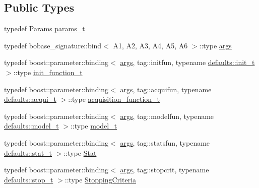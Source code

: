 \subsection*{Public Types}
\begin{DoxyCompactItemize}
\item 
typedef Params \hyperlink{classlimbo_1_1bayes__opt_1_1_bo_base_ae46fa6c574ca2a2c4368c8c9d3ff63e5}{params\+\_\+t}
\item 
typedef bobase\+\_\+signature\+::bind$<$ A1, A2, A3, A4, A5, A6 $>$\+::type \hyperlink{classlimbo_1_1bayes__opt_1_1_bo_base_a3844c259aa1e59d0241f90390aa6f7fa}{args}
\item 
typedef boost\+::parameter\+::binding$<$ \hyperlink{classlimbo_1_1bayes__opt_1_1_bo_base_a3844c259aa1e59d0241f90390aa6f7fa}{args}, tag\+::initfun, typename \hyperlink{structlimbo_1_1bayes__opt_1_1_bo_base_1_1defaults_a675d927a474fc77608cc63c8406448f7}{defaults\+::init\+\_\+t} $>$\+::type \hyperlink{classlimbo_1_1bayes__opt_1_1_bo_base_a734d263ce8c37ae2c5233f9e4499828c}{init\+\_\+function\+\_\+t}
\item 
typedef boost\+::parameter\+::binding$<$ \hyperlink{classlimbo_1_1bayes__opt_1_1_bo_base_a3844c259aa1e59d0241f90390aa6f7fa}{args}, tag\+::acquifun, typename \hyperlink{structlimbo_1_1bayes__opt_1_1_bo_base_1_1defaults_a4cb9b80ab762b3b763fdd97e893886e5}{defaults\+::acqui\+\_\+t} $>$\+::type \hyperlink{classlimbo_1_1bayes__opt_1_1_bo_base_a200a43abb6c95d2d99660898b36f2200}{acquisition\+\_\+function\+\_\+t}
\item 
typedef boost\+::parameter\+::binding$<$ \hyperlink{classlimbo_1_1bayes__opt_1_1_bo_base_a3844c259aa1e59d0241f90390aa6f7fa}{args}, tag\+::modelfun, typename \hyperlink{structlimbo_1_1bayes__opt_1_1_bo_base_1_1defaults_a07f65b6332c4f0c029069100feecb789}{defaults\+::model\+\_\+t} $>$\+::type \hyperlink{classlimbo_1_1bayes__opt_1_1_bo_base_a151af5c7eef92a82d8813bb2e067d267}{model\+\_\+t}
\item 
typedef boost\+::parameter\+::binding$<$ \hyperlink{classlimbo_1_1bayes__opt_1_1_bo_base_a3844c259aa1e59d0241f90390aa6f7fa}{args}, tag\+::statsfun, typename \hyperlink{structlimbo_1_1bayes__opt_1_1_bo_base_1_1defaults_ab8f3991474723d27b9c77d0e0a76fce2}{defaults\+::stat\+\_\+t} $>$\+::type \hyperlink{classlimbo_1_1bayes__opt_1_1_bo_base_adda0d6bf0fa0def996eb0af7e8a84f3f}{Stat}
\item 
typedef boost\+::parameter\+::binding$<$ \hyperlink{classlimbo_1_1bayes__opt_1_1_bo_base_a3844c259aa1e59d0241f90390aa6f7fa}{args}, tag\+::stopcrit, typename \hyperlink{structlimbo_1_1bayes__opt_1_1_bo_base_1_1defaults_a66e1dbe1ccd9dbef0fdfc5c9faee9eff}{defaults\+::stop\+\_\+t} $>$\+::type \hyperlink{classlimbo_1_1bayes__opt_1_1_bo_base_a06717d469296323cc277e3769b828e98}{Stopping\+Criteria}

\end{DoxyCompactItemize}
